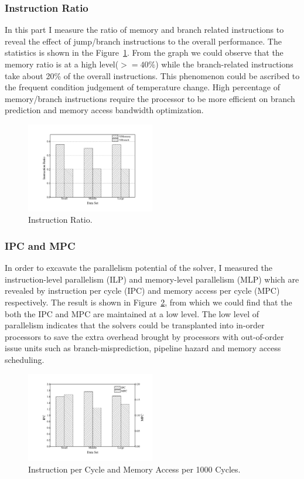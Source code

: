\subsubsection{Instruction Ratio}
In this part I measure the ratio of memory and branch related instructions to reveal the effect of jump/branch instructions to the overall performance. The statistics is shown in the Figure~\ref{fig:ratio}. From the graph we could observe that the memory ratio is at a high level($>=40\%$) while the branch-related instructions take about 20\% of the overall instructions. This phenomenon could be ascribed to the frequent condition judgement of temperature change. High percentage of memory/branch instructions require the processor to be more efficient on branch prediction and memory access bandwidth optimization.

\begin{figure}
\centering
\includegraphics[width=0.50\textwidth]{graph/ins_ratio.pdf}
\caption{Instruction Ratio.}
\label{fig:ratio}
\end{figure}

\subsubsection{IPC and MPC}
In order to excavate the parallelism potential of the \SA solver, I measured the instruction-level parallelism (ILP) and memory-level parallelism (MLP) which are revealed by instruction per cycle (IPC) and memory access per cycle (MPC) respectively. The result is shown in Figure~\ref{fig:ipc_mpc}, from which we could find that the both the IPC and MPC are maintained at a low level. The low level of parallelism indicates that the \SA solvers could be transplanted into in-order processors to save the extra overhead brought by processors with out-of-order issue units such as branch-misprediction, pipeline hazard and memory access scheduling. 

\begin{figure}
\centering
\includegraphics[width=0.50\textwidth]{graph/IPC_MPC.pdf}
\caption{Instruction per Cycle and Memory Access per 1000 Cycles.}
\label{fig:ipc_mpc}
\end{figure}

